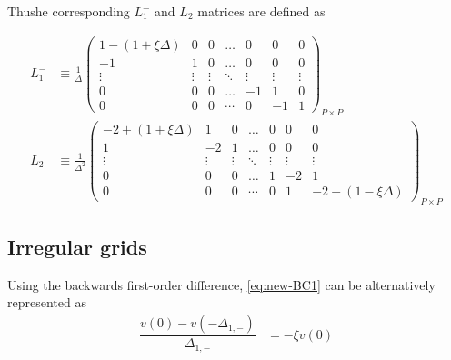 \documentclass[11pt]{article}
\begin{document}
Thushe corresponding $L_1^{-}$ and $L_2$ matrices are defined as 

\begin{align}
L_1^{-} &\equiv \frac{1}{\Delta}\begin{pmatrix}
1 - (1 + \xi \Delta) &0&0&\dots&0&0&0\\
-1&1&0&\dots&0&0&0\\
\vdots&\vdots&\vdots&\ddots&\vdots&\vdots&\vdots\\
0&0&0&\dots&-1&1&0\\
0&0&0&\cdots&0&-1&1
\end{pmatrix}_{P\times P}\label{eq:L-1-regular} \\
L_2 &\equiv \frac{1}{\Delta^2}\begin{pmatrix}
-2 + (1 + \xi\Delta) &1&0&\dots&0&0&0\\
1&-2&1&\dots&0&0&0\\
\vdots&\vdots&\vdots&\ddots&\vdots&\vdots&\vdots\\
0&0&0&\dots&1&-2&1\\
0&0&0&\cdots&0&1&-2 + (1- \xi\Delta)
\end{pmatrix}_{P\times P}\label{eq:L-2-regular}
\end{align}

\subsection{Irregular grids}
Using the backwards first-order difference, \eqref{eq:new-BC1} can be alternatively represented as
\begin{align}
\dfrac{v(0) - v(-\Delta_{1, -})}{\Delta_{1, -}} &= - \xi v(0)
\end{align}
\end{document}

